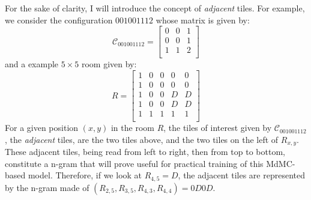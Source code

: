 \documentclass{article}
\begin{document}
\noindent For the sake of clarity, I will introduce the concept of \textit{adjacent} tiles. For example, we consider the configuration $001001112$ whose matrix is given by:
$$
\mathcal{C}_{001001112} =
\begin{bmatrix}
    0 & 0 & 1\\
    0 & 0 & 1\\
    1 & 1 & 2\\
\end{bmatrix}
$$
and a example $5\times5$ room given by:
$$
R =
\begin{bmatrix}
    1 & 0 & 0 & 0 & 0\\
    1 & 0 & 0 & 0 & 0\\
    1 & 0 & 0 & D & D\\
    1 & 0 & 0 & D & D\\
    1 & 1 & 1 & 1 & 1\\
\end{bmatrix}
$$
For a given position $(x,y)$ in the room $R$, the tiles of interest given by $\mathcal{C}_{001001112}$, the \textit{adjacent} tiles, are the two tiles above, and the two tiles on the left of $R_{x,y}$. These adjacent tiles, being read from left to right, then from top to bottom, constitute a n-gram that will prove useful for practical training of this MdMC-based model. Therefore, if we look at $R_{4,5} = D$, the adjacent tiles are represented by the n-gram made of $(R_{2,5}, R_{3,5}, R_{4,3}, R_{4,4}) = 0D0D$. 
\end{document}
